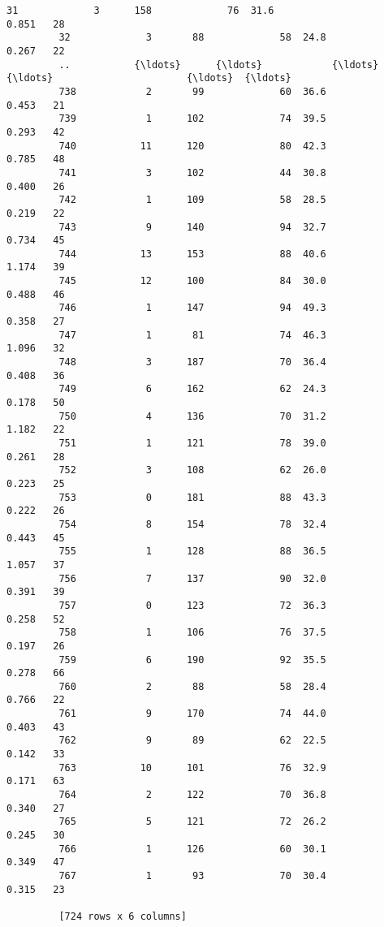 \documentclass[11pt]{article}
\begin{document}
\begin{Verbatim}[commandchars=\\\{\}]
         31             3      158             76  31.6                     0.851   28
         32             3       88             58  24.8                     0.267   22
         ..           {\ldots}      {\ldots}            {\ldots}   {\ldots}                       {\ldots}  {\ldots}
         738            2       99             60  36.6                     0.453   21
         739            1      102             74  39.5                     0.293   42
         740           11      120             80  42.3                     0.785   48
         741            3      102             44  30.8                     0.400   26
         742            1      109             58  28.5                     0.219   22
         743            9      140             94  32.7                     0.734   45
         744           13      153             88  40.6                     1.174   39
         745           12      100             84  30.0                     0.488   46
         746            1      147             94  49.3                     0.358   27
         747            1       81             74  46.3                     1.096   32
         748            3      187             70  36.4                     0.408   36
         749            6      162             62  24.3                     0.178   50
         750            4      136             70  31.2                     1.182   22
         751            1      121             78  39.0                     0.261   28
         752            3      108             62  26.0                     0.223   25
         753            0      181             88  43.3                     0.222   26
         754            8      154             78  32.4                     0.443   45
         755            1      128             88  36.5                     1.057   37
         756            7      137             90  32.0                     0.391   39
         757            0      123             72  36.3                     0.258   52
         758            1      106             76  37.5                     0.197   26
         759            6      190             92  35.5                     0.278   66
         760            2       88             58  28.4                     0.766   22
         761            9      170             74  44.0                     0.403   43
         762            9       89             62  22.5                     0.142   33
         763           10      101             76  32.9                     0.171   63
         764            2      122             70  36.8                     0.340   27
         765            5      121             72  26.2                     0.245   30
         766            1      126             60  30.1                     0.349   47
         767            1       93             70  30.4                     0.315   23
         
         [724 rows x 6 columns]
\end{Verbatim}
            
\end{document}
